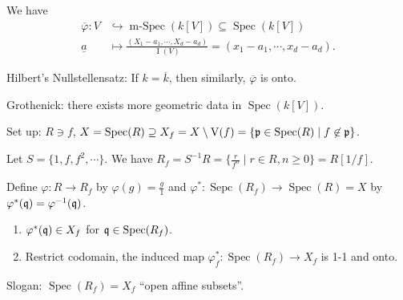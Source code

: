 \begin{construction*}
    We have 
    \begin{align*}
        \overbar \varphi: V &\hookrightarrow \operatorname{m-Spec}(k[V]) \subseteq \operatorname{Spec}(k[V]) \\
        \underline a &\mapsto \frac{(X_1-a_1,\cdots,X_d-a_d)}{\operatorname{I}(V)} = (x_1 - a_1,\cdots, x_d - a_d). 
    \end{align*}
    \par Hilbert's Nullstellensatz: If $k = \overbar k$, then similarly, $\overbar \varphi$ is onto. \par 
    Grothenick: there exists more geometric data in $\operatorname{Spec}(k[V])$. 
\end{construction*}

\noindent Set up: $R \ni f$, $X = \operatorname{Spec}(R) \supseteq X_f = X \setminus \operatorname{V}(f) = \{\mathfrak{p} \in \operatorname{Spec}(R) \mid f \not \in \mathfrak{p}\}$.

\begin{recall*}
    Let $S = \{1,f,f^2,\cdots\}$. We have $R_f = S^{-1}R = \{\frac{r}{f^n} \mid r \in R, n \geq 0\} = R[1/f]$.
\end{recall*}

\begin{proposition}
    Define $\varphi: R \to R_f$ by $\varphi(g) = \frac{g}{1}$ and $\varphi^*: \operatorname{Sepc}(R_f) \to \operatorname{Spec}(R) = X$ by $\varphi^*(\mathfrak{q}) = \varphi^{-1}(\mathfrak{q})$.
    \begin{enumerate}
        \item $\varphi^*(\mathfrak{q}) \in X_f$ for $\mathfrak{q} \in \operatorname{Spec}(R_f)$. 
        \item Restrict codomain, the induced map $\varphi_f^*: \operatorname{Spec}(R_f) \to X_f$ is 1-1 and onto.
    \end{enumerate}
    Slogan: $\operatorname{Spec}(R_f) = X_f$ ``open affine subsets''.
\end{proposition}

